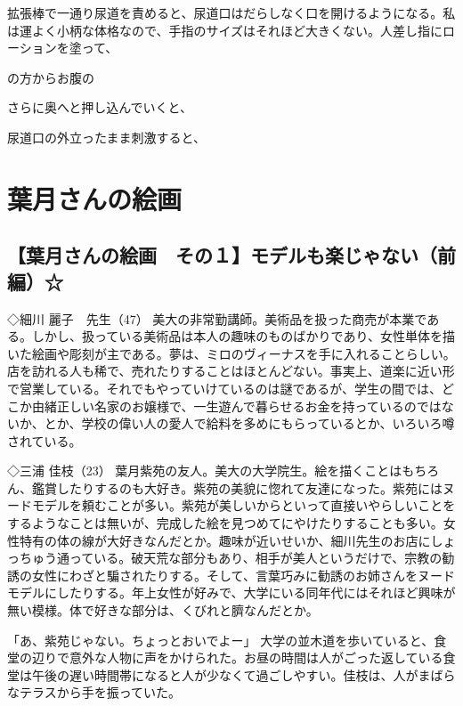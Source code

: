 拡張棒で一通り尿道を責めると、尿道口はだらしなく口を開けるようになる。私は運よく小柄な体格なので、手指のサイズはそれほど大きくない。人差し指にローションを塗って、

の方からお腹の




さらに奥へと押し込んでいくと、


尿道口の外立ったまま刺激すると、






\chapter{葉月さんの絵画}
\section{【葉月さんの絵画　その１】モデルも楽じゃない（前編）☆}

◇細川 麗子　先生（47）
美大の非常勤講師。美術品を扱った商売が本業である。しかし、扱っている美術品は本人の趣味のものばかりであり、女性単体を描いた絵画や彫刻が主である。夢は、ミロのヴィーナスを手に入れることらしい。店を訪れる人も稀で、売れたりすることはほとんどない。事実上、道楽に近い形で営業している。それでもやっていけているのは謎であるが、学生の間では、どこか由緒正しい名家のお嬢様で、一生遊んで暮らせるお金を持っているのではないか、とか、学校の偉い人の愛人で給料を多めにもらっているとか、いろいろ噂されている。


◇三浦 佳枝（23）
葉月紫苑の友人。美大の大学院生。絵を描くことはもちろん、鑑賞したりするのも大好き。紫苑の美貌に惚れて友達になった。紫苑にはヌードモデルを頼むことが多い。紫苑が美しいからといって直接いやらしいことをするようなことは無いが、完成した絵を見つめてにやけたりすることも多い。女性特有の体の線が大好きなんだとか。趣味が近いせいか、細川先生のお店にしょっちゅう通っている。破天荒な部分もあり、相手が美人というだけで、宗教の勧誘の女性にわざと騙されたりする。そして、言葉巧みに勧誘のお姉さんをヌードモデルにしたりする。年上女性が好みで、大学にいる同年代にはそれほど興味が無い模様。体で好きな部分は、くびれと臍なんだとか。


「あ、紫苑じゃない。ちょっとおいでよー」
大学の並木道を歩いていると、食堂の辺りで意外な人物に声をかけられた。お昼の時間は人がごった返している食堂は午後の遅い時間帯になると人が少なくて過ごしやすい。佳枝は、人がまばらなテラスから手を振っていた。

